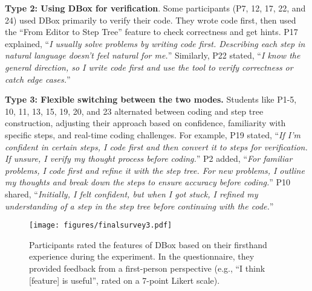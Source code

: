 \colorbox{color3}{\textbf{Type 2: Using DBox for verification}.} Some participants (P7, 12, 17, 22, and 24) used DBox primarily to verify their code. They wrote code first, then used the ``From Editor to Step Tree'' feature to check correctness and get hints. P17 explained, ``\emph{I usually solve problems by writing code first. Describing each step in natural language doesn’t feel natural for me.}'' Similarly, P22 stated, ``\emph{I know the general direction, so I write code first and use the tool to verify correctness or catch edge cases.}''

\colorbox{color1}{\textbf{Type 3: Flexible switching between the two modes.}} Students like P1-5, 10, 11, 13, 15, 19, 20, and 23 alternated between coding and step tree construction, adjusting their approach based on confidence, familiarity with specific steps, and real-time coding challenges. For example, P19 stated, ``\emph{If I'm confident in certain steps, I code first and then convert it to steps for verification. If unsure, I verify my thought process before coding.}'' P2 added, ``\emph{For familiar problems, I code first and refine it with the step tree. For new problems, I outline my thoughts and break down the steps to ensure accuracy before coding.}'' P10 shared, ``\emph{Initially, I felt confident, but when I got stuck, I refined my understanding of a step in the step tree before continuing with the code.}''





\begin{figure*}[htbp]
	\centering 
	\texttt{[image: figures/finalsurvey3.pdf]}
	\caption{Participants rated the features of DBox based on their firsthand experience during the experiment. In the questionnaire, they provided feedback from a first-person perspective (e.g., ``I think [feature] is useful'', rated on a 7-point Likert scale).}
	\label{finalsurvey}
        \Description{}
\end{figure*}


